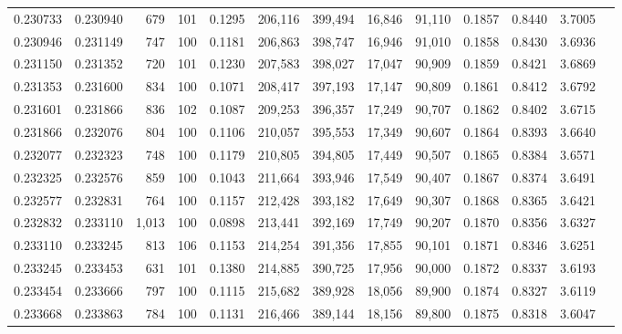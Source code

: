 \begin{tabular}{rrrrrrrrrrrrr}
0.230733 & 0.230940 &   679 & 101 &                                     0.1295 & 206,116 & 399,494 &  16,846 &  91,110 & 0.1857 & 0.8440 & 3.7005 \\
0.230946 & 0.231149 &   747 & 100 &                                     0.1181 & 206,863 & 398,747 &  16,946 &  91,010 & 0.1858 & 0.8430 & 3.6936 \\
0.231150 & 0.231352 &   720 & 101 &                                     0.1230 & 207,583 & 398,027 &  17,047 &  90,909 & 0.1859 & 0.8421 & 3.6869 \\
0.231353 & 0.231600 &   834 & 100 &                                     0.1071 & 208,417 & 397,193 &  17,147 &  90,809 & 0.1861 & 0.8412 & 3.6792 \\
0.231601 & 0.231866 &   836 & 102 &                                     0.1087 & 209,253 & 396,357 &  17,249 &  90,707 & 0.1862 & 0.8402 & 3.6715 \\
0.231866 & 0.232076 &   804 & 100 &                                     0.1106 & 210,057 & 395,553 &  17,349 &  90,607 & 0.1864 & 0.8393 & 3.6640 \\
0.232077 & 0.232323 &   748 & 100 &                                     0.1179 & 210,805 & 394,805 &  17,449 &  90,507 & 0.1865 & 0.8384 & 3.6571 \\
0.232325 & 0.232576 &   859 & 100 &                                     0.1043 & 211,664 & 393,946 &  17,549 &  90,407 & 0.1867 & 0.8374 & 3.6491 \\
0.232577 & 0.232831 &   764 & 100 &                                     0.1157 & 212,428 & 393,182 &  17,649 &  90,307 & 0.1868 & 0.8365 & 3.6421 \\
0.232832 & 0.233110 & 1,013 & 100 &                                     0.0898 & 213,441 & 392,169 &  17,749 &  90,207 & 0.1870 & 0.8356 & 3.6327 \\
0.233110 & 0.233245 &   813 & 106 &                                     0.1153 & 214,254 & 391,356 &  17,855 &  90,101 & 0.1871 & 0.8346 & 3.6251 \\
0.233245 & 0.233453 &   631 & 101 &                                     0.1380 & 214,885 & 390,725 &  17,956 &  90,000 & 0.1872 & 0.8337 & 3.6193 \\
0.233454 & 0.233666 &   797 & 100 &                                     0.1115 & 215,682 & 389,928 &  18,056 &  89,900 & 0.1874 & 0.8327 & 3.6119 \\
0.233668 & 0.233863 &   784 & 100 &                                     0.1131 & 216,466 & 389,144 &  18,156 &  89,800 & 0.1875 & 0.8318 & 3.6047 \\

\end{tabular}
